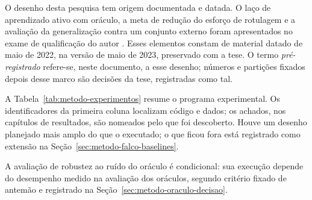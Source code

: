 O desenho desta pesquisa tem origem documentada e datada. O laço de
aprendizado ativo com oráculo, a meta de redução do esforço de rotulagem e
a avaliação da generalização contra um conjunto externo foram apresentados
no exame de qualificação do autor \citep{Daru2023Qualificacao}. Esses
elementos constam de material datado de maio de 2022, na versão de maio de
2023, preservado com a tese. O termo \emph{pré-registrado} refere-se, neste
documento, a esse desenho; números e partições fixados depois desse marco são
decisões da tese, registradas como tal.

A Tabela~\ref{tab:metodo-experimentos} resume o programa experimental. Os
identificadores da primeira coluna localizam código e dados; os achados,
nos capítulos de resultados, são nomeados pelo que foi descoberto. Houve um desenho planejado mais amplo do que o
executado; o que ficou fora está registrado como extensão na
Seção~\ref{sec:metodo-falco-baselines}.

A avaliação de robustez ao ruído do oráculo é condicional: sua
execução depende do desempenho medido na avaliação dos oráculos, segundo
critério fixado de antemão e registrado na
Seção~\ref{sec:metodo-oraculo-decisao}.

